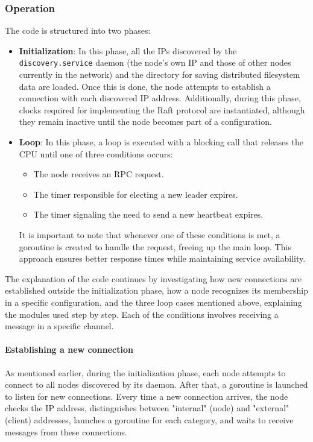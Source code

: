 \subsubsection{Operation}
The code is structured into two phases:
\begin{itemize}
  \item \textbf{Initialization}: In this phase, all the IPs discovered by the \texttt{discovery.service}
    daemon (the node's own IP and those of other nodes currently in the network) and the 
    directory for saving distributed filesystem data are loaded. Once this is done, the node 
    attempts to establish a connection with each discovered IP address. Additionally, during 
    this phase, clocks required for implementing the Raft protocol are instantiated, although 
    they remain inactive until the node becomes part of a configuration.
  \item \textbf{Loop}: In this phase, a loop is executed with a blocking call that releases the 
    CPU until one of three conditions occurs:
    \begin{itemize}
      \item The node receives an RPC request.
      \item The timer responsible for electing a new leader expires.
      \item The timer signaling the need to send a new heartbeat expires.
    \end{itemize}   
    It is important to note that whenever one of these conditions is met, a goroutine is 
    created to handle the request, freeing up the main loop. This approach ensures better 
    response times while maintaining service availability.
\end{itemize}
The explanation of the code continues by investigating how new connections are established 
outside the initialization phase, how a node recognizes its membership in a specific configuration, 
and the three loop cases mentioned above, explaining the modules used step by step. Each 
of the conditions involves receiving a message in a specific channel.

\paragraph{Establishing a new connection}
As mentioned earlier, during the initialization phase, each node attempts to connect to all 
nodes discovered by its daemon.
After that, a goroutine is launched to listen for new connections. Every time a new connection 
arrives, the node checks the IP address, distinguishes between "internal" (node) and "external"
(client) addresses, launches a goroutine for each category, and waits to receive messages 
from these connections.


